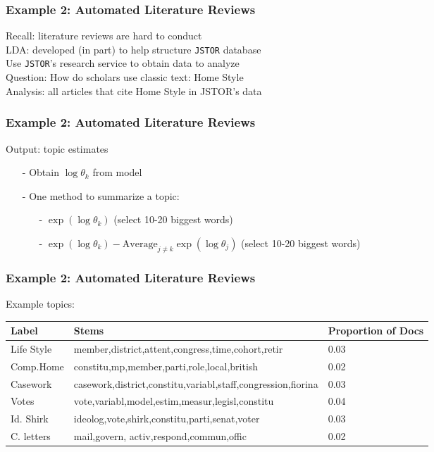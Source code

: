 \documentclass{beamer}
\numberwithin{equation}{section}
\begin{document}
\begin{frame}



\end{frame}




\begin{frame}
\frametitle{Example 2: Automated Literature Reviews}

\alert{Recall}: literature reviews are hard to conduct\\
\alert{LDA}: developed (in part) to help structure {\tt JSTOR} database\\
Use {\tt JSTOR}'s research service to obtain data to analyze\\
\alert{Question:} How do scholars use classic text: \alert{Home Style}\\
Analysis: all articles that cite \alert{Home Style} in JSTOR's data\\

\end{frame}





\begin{frame}
\frametitle{Example 2: Automated Literature Reviews}

Output: topic estimates
\begin{itemize}
\item[-] Obtain $\log \theta_k$ from model
\item[-] One method to summarize a topic:
\begin{itemize}
\item[-] $\exp(\log \theta_k) $ (select 10-20 biggest words)
\item[-] $\exp(\log \theta_k) - \text{Average}_{j\neq k} \exp(\log \theta_j)$ (select 10-20 biggest words)
\end{itemize}
\end{itemize}


\end{frame}

\begin{frame}
\frametitle{Example 2: Automated Literature Reviews}
Example topics:
\small
\begin{tabular}{lll}
\hline\hline
Label & Stems & Proportion of Docs \\
\hline
Life Style & member,district,attent,congress,time,cohort,retir & 0.03  \\
Comp.Home & constitu,mp,member,parti,role,local,british &  0.02  \\
Casework & casework,district,constitu,variabl,staff,congression,fiorina & 0.03\\
Votes & vote,variabl,model,estim,measur,legisl,constitu & 0.04 \\
Id. Shirk & ideolog,vote,shirk,constitu,parti,senat,voter & 0.03\\
C. letters & mail,govern, activ,respond,commun,offic &  0.02\\
\hline
\hline
\end{tabular}


\end{frame}
\end{document}
